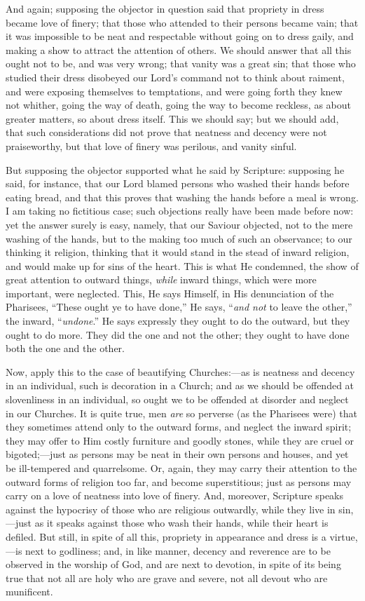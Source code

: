 And again; supposing the objector in question said that propriety
in dress became love of finery; that those who attended to their
persons became vain; that it was impossible to be neat and respectable
without going on to dress gaily, and making a show to attract the
attention of others. We should answer that all this ought not to be,
and was very wrong; that vanity was a great sin; that those who
studied their dress disobeyed our Lord's command not to think about
raiment, and were exposing themselves to temptations, and were going
forth they knew not whither, going the way of death, going the way to
become reckless, as about greater matters, so about dress itself. This
we should say; but we should add, that such considerations did not
prove that neatness and decency were not praiseworthy, but that love
of finery was perilous, and vanity sinful.

But supposing the objector supported what he said by Scripture:
supposing he said, for instance, that our Lord blamed persons who
washed their hands before eating bread, and that this proves that
washing the hands before a meal is wrong. I am taking no fictitious
case; such objections really have been made before now: yet the answer
surely is easy, namely, that our Saviour objected, not to the mere
washing of the hands, but to the making too much of such an
observance; to our thinking it religion, thinking that it would stand
in the stead of inward religion, and would make up for sins of the
heart. This is what He condemned, the show of great attention to
outward things, \emph{while} inward things, which were more important, were
neglected. This, He says Himself, in His denunciation of the
Pharisees, ``These ought ye to have done,'' He says, ``\emph{and
not} to leave the other,'' the inward, ``\emph{undone}.''
He says expressly they ought to do the outward, but they ought to do
more. They did the one and not the other; they ought to have done both
the one and the other.

Now, apply this to the case of beautifying Churches:—as is
neatness and decency in an individual, such is decoration in a Church;
and as we should be offended at slovenliness in an individual, so
ought we to be offended at disorder and neglect in our Churches. It is
quite true, men \emph{are} so perverse (as the Pharisees were) that
they sometimes attend only to the outward forms, and neglect the
inward spirit; they may offer to Him costly furniture and goodly
stones, while they are cruel or bigoted;—just as persons may be neat
in their own persons and houses, and yet be ill-tempered and
quarrelsome. Or, again, they may carry their attention to the outward
forms of religion too far, and become superstitious; just as persons
may carry on a love of neatness into love of finery. And, moreover,
Scripture speaks against the hypocrisy of those who are religious
outwardly, while they live in sin,—just as it speaks against those
who wash their hands, while their heart is defiled. But still, in
spite of all this, propriety in appearance and dress is a virtue,—is
next to godliness; and, in like manner, decency and reverence are to
be observed in the worship of God, and are next to devotion, in spite
of its being true that not all are holy who are grave and severe, not
all devout who are munificent.

